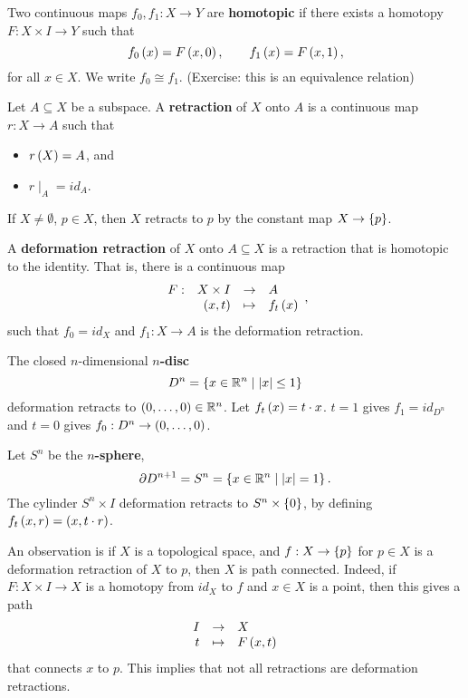 \begin{definition*}
Two continuous maps $ f_0, f_1 : X \to Y $ are \textbf{homotopic} if there exists a homotopy $ F : X \times I \to Y $ such that
$$ f_0\left( x \right) = F\left( x, 0 \right), \qquad f_1\left( x \right) = F\left( x, 1 \right), $$
for all $ x \in X $. We write $ f_0 \cong f_1 $. (Exercise: this is an equivalence relation)
\end{definition*}

\begin{definition*}
Let $ A \subseteq X $ be a subspace. A \textbf{retraction} of $ X $ onto $ A $ is a continuous map $ r : X \to A $ such that
\begin{itemize}
\item $ r\left( X \right) = A $, and
\item $ r\mid_A = id_A $.
\end{itemize}
\end{definition*}

\begin{example*}
If $ X \ne \emptyset $, $ p \in X $, then $ X $ retracts to $ p $ by the constant map $ X \to \left\{ p \right\} $.
\end{example*}

\begin{definition*}
A \textbf{deformation retraction} of $ X $ onto $ A \subseteq X $ is a retraction that is homotopic to the identity. That is, there is a continuous map
$$ \function[F]{X \times I}{A}{\rb{x, t}}{f_t\rb{x}}, $$
such that $ f_0 = id_X $ and $ f_1 : X \to A $ is the deformation retraction.
\end{definition*}

\begin{example*}
The closed $ n $-dimensional \textbf{$ n $-disc}
$$ D^n = \left\{ x \in \mathbb{R}^n \mid \left\lvert x \right\rvert \le 1 \right\} $$
deformation retracts to $ \left( 0, \dots, 0 \right) \in \mathbb{R}^n $. Let $ f_t\left( x \right) = t \cdot x $. $ t = 1 $ gives $ f_1 = id_{D^n} $ and $ t = 0 $ gives $ f_0 : D^n \to \left( 0, \dots, 0 \right) $.
\end{example*}

\begin{example*}
Let $ S^n $ be the \textbf{$ n $-sphere},
$$ \partial D^{n + 1} = S^n = \left\{ x \in \mathbb{R}^n \mid \left\lvert x \right\rvert = 1 \right\}. $$
The cylinder $ S^n \times I $ deformation retracts to $ S^n \times \left\{ 0 \right\} $, by defining $ f_t\left( x, r \right) = \left( x, t \cdot r \right) $.
\end{example*}

An observation is if $ X $ is a topological space, and $ f : X \to \left\{ p \right\} $ for $ p \in X $ is a deformation retraction of $ X $ to $ p $, then $ X $ is path connected. Indeed, if $ F : X \times I \to X $ is a homotopy from $ id_X $ to $ f $ and $ x \in X $ is a point, then this gives a path
$$ \function{I}{X}{t}{F\rb{x, t}} $$
that connects $ x $ to $ p $. This implies that not all retractions are deformation retractions.

